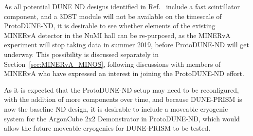 As all potential DUNE ND designs identified in Ref.~\cite{dune_ndcsg} include a fast scintillator component, and a 3DST module will not be available on the timescale of ProtoDUNE-ND, it is desirable to see whether elements of the existing MINERvA detector in the NuMI hall can be re-purposed, as the MINERvA experiment will stop taking data in summer 2019, before ProtoDUNE-ND will get underway. This possibility is discussed separately in Section~\ref{sec:MINERvA_MINOS}, following discussions with members of MINERvA who have expressed an interest in joining the ProtoDUNE-ND effort.

As it is expected that the ProtoDUNE-ND setup may need to be reconfigured, with the addition of more components over time, and because DUNE-PRISM is now the baseline ND design, it is desirable to include a moveable cryogenic system for the ArgonCube 2x2 Demonstrator in ProtoDUNE-ND, which would allow the future moveable cryogenics for DUNE-PRISM to be tested.

